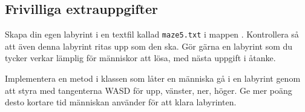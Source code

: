 \subsection{Frivilliga extrauppgifter}

\Task Skapa din egen labyrint i en textfil kallad \texttt{maze5.txt} i mappen . Kontrollera så att även denna labyrint ritas upp som den ska. Gör gärna en labyrint som du tycker verkar lämplig för människor att lösa, med nästa uppgift i åtanke.


\Task Implementera en metod  i klassen  som låter en människa gå i en labyrint genom att styra  med tangenterna WASD för upp, vänster, ner, höger. Ge mer poäng desto kortare tid människan använder för att klara labyrinten.

